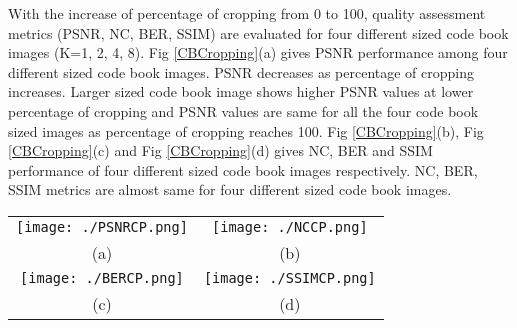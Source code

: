 \begin{table*}
\caption{Comparison of assessment metrics for different sized code book images without any noise}
\smallskip\noindent
{}
\end{table*}


With the increase of percentage of cropping from 0 to 100, quality assessment metrics (PSNR, NC, BER, SSIM) are evaluated for four different sized code book images (K=1, 2, 4, 8). Fig \ref{CBCropping}(a) gives PSNR performance among four different sized code book images. PSNR decreases as percentage of cropping increases. Larger sized code book image shows higher PSNR values at lower percentage of cropping and PSNR values are same for all the four code book sized images as percentage of cropping reaches 100. Fig \ref{CBCropping}(b), Fig \ref{CBCropping}(c) and Fig \ref{CBCropping}(d) gives NC, BER and SSIM performance of four different sized code book images respectively. NC, BER, SSIM metrics are almost same for four different sized code book images.  \\

\begin{figure*}
\begin{tabular}{cc}
\texttt{[image: ./PSNRCP.png]}&\texttt{[image: ./NCCP.png]}\\
(a)  & (b) \\
\texttt{[image: ./BERCP.png]}&\texttt{[image: ./SSIMCP.png]}\\
(c)   & (d)
\end{tabular}
\caption{(a) PSNR Vs Percentage of Cropping, (b) NC Vs Percentage of Cropping,  (c) BER Vs Percentage of Cropping,  (d) SSIM Vs Percentage of Cropping }
\label{CBCropping}
\end{figure*} 

